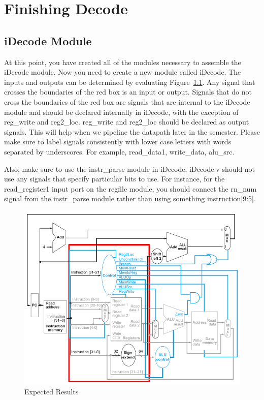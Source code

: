 \chapter{Finishing Decode}

\section{iDecode Module}
At this point, you have created all of the modules necessary to assemble the iDecode module.  Now you need to create a new module called iDecode.  The inputs and outputs can be determined by evaluating Figure~\ref{fig:decode_stage}.  Any signal that crosses the boundaries of the red box is an input or output.  Signals that do not cross the boundaries of the red box are signals that are internal to the iDecode module and should be declared internally in iDecode, with the exception of reg\_write and reg2\_loc.  reg\_write and reg2\_loc should be declared as output signals.  This will help when we pipeline the datapath later in the semester.   Please make sure to label signals consistently with lower case letters with words separated by underscores.  For example, read\_data1, write\_data, alu\_src.  

Also, make sure to use the instr\_parse module in iDecode.  iDecode.v should not use any signals that specify particular bits to use.  For instance, for the read\_register1 input port on the regfile module, you should connect the rn\_num signal from the instr\_parse module rather than using something instruction[9:5].  

\begin{figure}
	\caption{Expected Results}\label{fig:decode_stage}
	\begin{center}
		\includegraphics[width=4.75in]{../images/decode_stage.png}
	\end{center}
\end{figure} 


